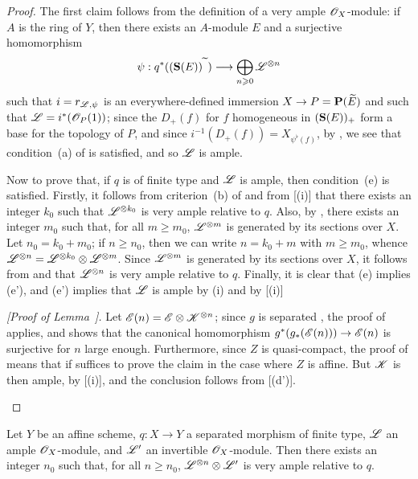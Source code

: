 \begin{proof}
The first claim follows from the definition  of a very ample $\mathscr{O}_X$-module: if $A$ is the ring of $Y$, then there exists an $A$-module $E$ and a surjective homomorphism
\[
  \psi: q^*((\bb{S}(E))^{\supertilde}) \to \bigoplus_{n\geq0}\sh{L}^{\otimes n}
\]
such that $i=r_{\mathscr{L},\psi}$ is an everywhere-defined immersion $X\to P=\bb{P}(\widetilde{E})$ and such that $\mathscr{L}=i^*(\mathscr{O}_P(1))$;
since the $D_+(f)$ for $f$ homogeneous in $(\mathbf{S}(E))_+$ form a base for the topology of $P$, and since $i^{-1}(D_+(f))=X_{\psi^\flat(f)}$, by , we see that condition~(a) of  is satisfied, and so $\mathscr{L}$ is ample.

Now to prove that, if $q$ is of finite type and $\mathscr{L}$ is ample, then condition~(e) is satisfied.
Firstly, it follows from criterion~(b) of  and from [(i)] that there exists
an integer $k_0$ such that $\mathscr{L}^{\otimes k_0}$ is very ample relative to $q$.
Also, by , there exists an integer $m_0$ such that, for all $m\geq m_0$, $\mathscr{L}^{\otimes m}$ is generated by its sections over $X$.
Let $n_0=k_0+m_0$;
if $n\geq n_0$, then we can write $n=k_0+m$ with $m\geq m_0$, whence $\mathscr{L}^{\otimes n}=\mathscr{L}^{\otimes k_0}\otimes\mathscr{L}^{\otimes m}$.
Since $\mathscr{L}^{\otimes m}$ is generated by its sections over $X$, it follows from  and  that $\mathscr{L}^{\otimes n}$ is very ample relative to $q$.
Finally, it is clear that (e) implies (e'), and (e') implies that $\mathscr{L}$ is ample by (i) and by [(i)]

  \begin{env}[4.5.10.1]
  \label{II.4.5.10.1}
  \emph{[Proof of Lemma~].}  
  Let $\mathscr{E}(n)=\mathscr{E}\otimes\mathscr{K}^{\otimes n}$;
  since $g$ is separated , the proof of  applies, and shows that the canonical homomorphism $g^*(g_*(\sh{E}(n)))\to\sh{E}(n)$ is surjective for $n$ large enough.
  Furthermore, since $Z$ is quasi-compact, the proof of  means that if suffices to prove the claim in the case where $Z$ is affine.
  But $\mathscr{K}$ is then ample, by [(i)], and the conclusion follows from [(d')].
  \end{env}
\end{proof}

\begin{corollary}[4.5.11]
\label{II.4.5.11}
Let $Y$ be an affine scheme, $q:X\to Y$ a separated morphism of finite type, $\mathscr{L}$ an ample $\mathscr{O}_X$-module, and $\mathscr{L}'$ an invertible $\mathscr{O}_X$-module.
Then there exists an integer $n_0$ such that, for all $n\geq n_0$, $\mathscr{L}^{\otimes n}\otimes\mathscr{L}'$ is very ample relative to $q$.
\end{corollary}

